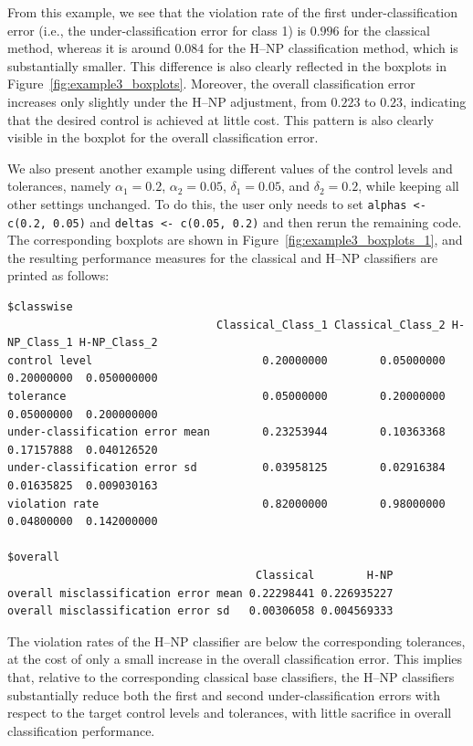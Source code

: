 From this example, we see that the violation rate of the first under-classification error (i.e., the under-classification error for class 1) is $0.996$ for the classical method, whereas it is around \(0.084\) for the H--NP classification method, which is substantially smaller. This difference is also clearly reflected in the boxplots in Figure~\ref{fig:example3_boxplots}. Moreover, the overall classification error increases only slightly under the H--NP adjustment, from \(0.223\) to \(0.23\), indicating that the desired control is achieved at little cost. This pattern is also clearly visible in the boxplot for the overall classification error. 

We also present another example using different values of the control levels and tolerances, namely \(\alpha_1 = 0.2\), \(\alpha_2 = 0.05\), \(\delta_1 = 0.05\), and \(\delta_2 = 0.2\), while keeping all other settings unchanged. To do this, the user only needs to set \texttt{alphas <- c(0.2, 0.05)} and \texttt{deltas <- c(0.05, 0.2)} and then rerun the remaining code. The corresponding boxplots are shown in Figure~\ref{fig:example3_boxplots_1}, and the resulting performance measures for the classical and H--NP classifiers are printed as follows:
\begin{verbatim}
$classwise
                                Classical_Class_1 Classical_Class_2 H-NP_Class_1 H-NP_Class_2
control level                          0.20000000        0.05000000   0.20000000  0.050000000
tolerance                              0.05000000        0.20000000   0.05000000  0.200000000
under-classification error mean        0.23253944        0.10363368   0.17157888  0.040126520
under-classification error sd          0.03958125        0.02916384   0.01635825  0.009030163
violation rate                         0.82000000        0.98000000   0.04800000  0.142000000

$overall
                                      Classical        H-NP
overall misclassification error mean 0.22298441 0.226935227
overall misclassification error sd   0.00306058 0.004569333
\end{verbatim}
The violation rates of the H--NP classifier are below the corresponding tolerances, at the cost of only a small increase in the overall classification error. This implies that, relative to the corresponding classical base classifiers, the H--NP classifiers substantially reduce both the first and second under-classification errors with respect to the target control levels and tolerances, with little sacrifice in overall classification performance.


